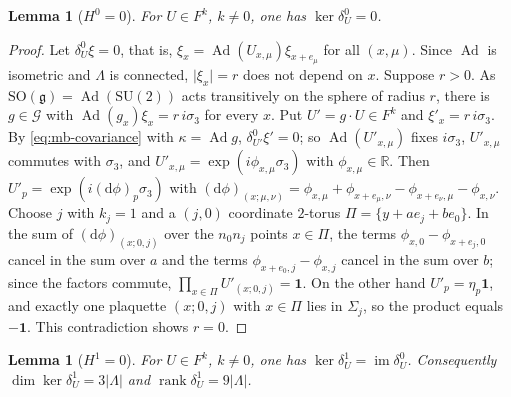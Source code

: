 \documentclass[11pt,a4paper]{amsart}
\newtheorem{lemma}[theorem]{Lemma}
\theoremstyle{definition}
\theoremstyle{remark}
\numberwithin{equation}{section}
\DeclareMathOperator{\rank}{rank}    %
\newcommand{\R}{\mathbb{R}}          %
\newcommand{\abs}[1]{\lvert #1\rvert}      %
\newcommand{\SU}{\mathrm{SU}}              %
\begin{document}
\begin{lemma}[$H^0=0$]\label{lem:mb-H0}
For $U\in F^k$, $k\ne0$, one has $\ker\delta^0_U=0$.
\end{lemma}

\begin{proof}
Let $\delta^0_U\xi=0$, that is, $\xi_x=\operatorname{Ad}(U_{x,\mu})\xi_{x+e_\mu}$ for all $(x,\mu)$. Since $\operatorname{Ad}$ is isometric and $\Lambda$ is connected, $\abs{\xi_x}=r$ does not depend on $x$. Suppose $r>0$. As $\mathrm{SO}(\mathfrak g)=\operatorname{Ad}(\SU(2))$ acts transitively on the sphere of radius $r$, there is $g\in\mathcal G$ with $\operatorname{Ad}(g_x)\xi_x=r\,i\sigma_3$ for every $x$. Put $U'=g\cdot U\in F^k$ and $\xi'_x=r\,i\sigma_3$. By \eqref{eq:mb-covariance} with $\kappa=\operatorname{Ad}g$, $\delta^0_{U'}\xi'=0$; so $\operatorname{Ad}(U'_{x,\mu})$ fixes $i\sigma_3$, $U'_{x,\mu}$ commutes with $\sigma_3$, and $U'_{x,\mu}=\exp(i\phi_{x,\mu}\sigma_3)$ with $\phi_{x,\mu}\in\R$. Then $U'_p=\exp(i(\mathrm d\phi)_p\sigma_3)$ with $(\mathrm d\phi)_{(x;\mu,\nu)}=\phi_{x,\mu}+\phi_{x+e_\mu,\nu}-\phi_{x+e_\nu,\mu}-\phi_{x,\nu}$. Choose $j$ with $k_j=1$ and a $(j,0)$ coordinate $2$-torus $\Pi=\{y+ae_j+be_0\}$. In the sum of $(\mathrm d\phi)_{(x;0,j)}$ over the $n_0n_j$ points $x\in\Pi$, the terms $\phi_{x,0}-\phi_{x+e_j,0}$ cancel in the sum over $a$ and the terms $\phi_{x+e_0,j}-\phi_{x,j}$ cancel in the sum over $b$; since the factors commute, $\prod_{x\in\Pi}U'_{(x;0,j)}=\mathbf 1$. On the other hand $U'_p=\eta_p\mathbf 1$, and exactly one plaquette $(x;0,j)$ with $x\in\Pi$ lies in $\Sigma_j$, so the product equals $-\mathbf 1$. This contradiction shows $r=0$.
\end{proof}

\begin{lemma}[$H^1=0$]\label{lem:mb-H1}
For $U\in F^k$, $k\ne0$, one has $\ker\delta^1_U=\operatorname{im}\delta^0_U$. Consequently $\dim\ker\delta^1_U=3\abs\Lambda$ and $\rank\delta^1_U=9\abs\Lambda$.
\end{lemma}
\end{document}
